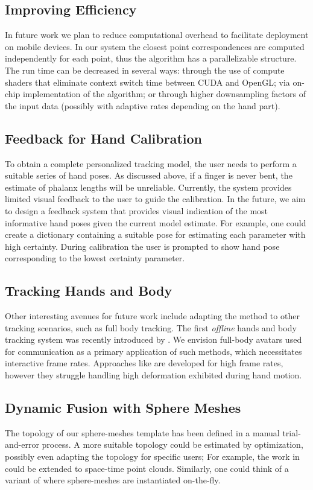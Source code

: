 \subsection*{Improving Efficiency}
In future work we plan to reduce computational overhead to facilitate deployment on mobile devices. In our system the closest point correspondences are computed independently for each point, thus the algorithm has a parallelizable structure. The run time can be decreased in several ways: through the use of compute shaders that eliminate context switch time between CUDA and OpenGL; via on-chip implementation of the algorithm; or through higher downsampling factors of the input data (possibly with adaptive rates depending on the hand part).

\subsection*{Feedback for Hand Calibration}
To obtain a complete personalized tracking model, the user needs to perform a suitable series of hand poses. As discussed above, if a finger is never bent, the estimate of phalanx lengths will be unreliable. Currently, the system provides limited visual feedback to the user to guide the calibration. In the future, we aim to design a feedback system that provides visual indication of the most informative hand poses given the current model estimate. For example, one could create a dictionary containing a suitable pose for estimating each parameter with high certainty. During calibration the user is prompted to show hand pose corresponding to the lowest certainty parameter. 

\subsection*{Tracking Hands and Body}
Other interesting avenues for future work include adapting the method to other tracking scenarios, such as full body tracking. The first \textit{offline} hands and body tracking system was recently introduced by \cite{romero2017embodied}. We envision full-body avatars used for communication as a primary application of such methods, which necessitates interactive frame rates. Approaches like \cite{ dou2017motion2fusion} are developed for high frame rates, however they struggle handling high deformation exhibited during hand motion.

\subsection*{Dynamic Fusion with Sphere Meshes}
The topology of our sphere-meshes template has been defined in a manual trial-and-error process. A more suitable topology could be estimated by optimization, possibly even adapting the topology for specific users; For example, the work in \cite{thiery2016spheremesh} could be extended to space-time point clouds. Similarly, one could think of a variant of \cite{newcombe2015dynfusion} where sphere-meshes are instantiated on-the-fly. 

